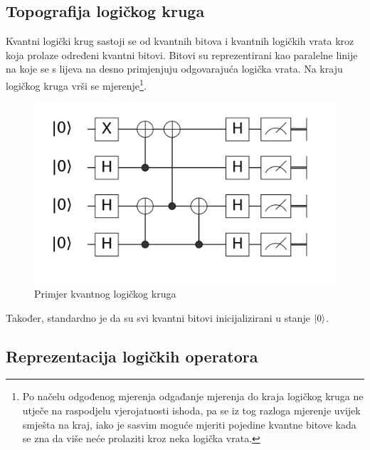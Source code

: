 \subsection{Topografija logičkog kruga}

Kvantni logički krug sastoji se od kvantnih bitova i kvantnih logičkih vrata kroz koja prolaze određeni kvantni bitovi. Bitovi su reprezentirani kao paralelne linije na koje se s lijeva na desno primjenjuju odgovarajuća logička vrata. Na kraju logičkog kruga vrši se mjerenje\footnote{Po načelu odgođenog mjerenja  odgađanje mjerenja do kraja logičkog kruga ne utječe na raspodjelu vjerojatnosti ishoda, pa se iz tog razloga mjerenje uvijek smješta na kraj, iako je sasvim moguće mjeriti pojedine kvantne bitove kada se zna da više neće prolaziti kroz neka logička vrata.}.
\begin{figure}[H]
\centering
\includegraphics[scale=0.16]{img/exampleqc.png}
\caption{Primjer kvantnog logičkog kruga} 
\end{figure}
Također, standardno je da su svi kvantni bitovi inicijalizirani u stanje $\ket{0}$.

\subsection{Reprezentacija logičkih operatora}

